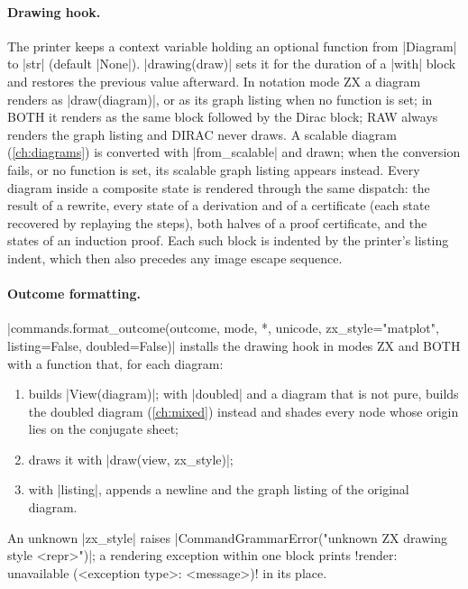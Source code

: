 {\paragraph{Drawing hook.} The printer keeps a context variable holding an optional function
from \py|Diagram| to \py|str| (default \py|None|). \py|drawing(draw)| sets it for the duration of
a \py|with| block and restores the previous value afterward. In notation mode ZX a diagram
renders as \py|draw(diagram)|, or as its graph listing when no function is set; in BOTH it
renders as the same block followed by the Dirac block; RAW always renders the graph listing and
DIRAC never draws. A scalable diagram (\cref{ch:diagrams}) is converted with
\py|from_scalable| and drawn; when the conversion fails, or no function is set, its scalable
graph listing appears instead. Every diagram inside a composite state is rendered through the
same dispatch: the result of a rewrite, every state of a derivation and of a certificate (each
state recovered by replaying the steps), both halves of a proof certificate, and the states of an
induction proof. Each such block is indented by the printer's listing indent, which then also
precedes any image escape sequence.

\paragraph{Outcome formatting.}
\py|commands.format_outcome(outcome, mode, *, unicode, zx_style="matplot", listing=False, doubled=False)|
installs the drawing hook in modes ZX and BOTH
with a function that, for each diagram:
\begin{enumerate}
  \item builds \py|View(diagram)|; with \py|doubled| and a diagram that is not pure, builds the
    doubled diagram (\cref{ch:mixed}) instead and shades every node whose origin lies on the
    conjugate sheet;
  \item draws it with \py|draw(view, zx_style)|;
  \item with \py|listing|, appends a newline and the graph listing of the original diagram.
\end{enumerate}
An unknown \py|zx_style| raises \py|CommandGrammarError("unknown ZX drawing style <repr>")|; a
rendering exception within one block prints
\code!render: unavailable (<exception type>: <message>)! in its place.

}
